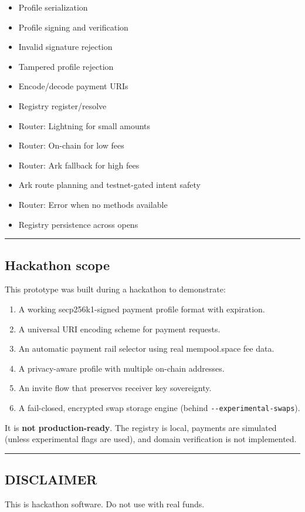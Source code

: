 \documentclass[
]{article}
\providecommand{\tightlist}{%
  \setlength{\itemsep}{0pt}\setlength{\parskip}{0pt}}
\begin{document}
\begin{itemize}
\tightlist
\item
  Profile serialization
\item
  Profile signing and verification
\item
  Invalid signature rejection
\item
  Tampered profile rejection
\item
  Encode/decode payment URIs
\item
  Registry register/resolve
\item
  Router: Lightning for small amounts
\item
  Router: On-chain for low fees
\item
  Router: Ark fallback for high fees
\item
  Ark route planning and testnet-gated intent safety
\item
  Router: Error when no methods available
\item
  Registry persistence across opens
\end{itemize}

\begin{center}\rule{0.5\linewidth}{0.5pt}\end{center}

\hypertarget{hackathon-scope}{%
\subsection{Hackathon scope}\label{hackathon-scope}}

This prototype was built during a hackathon to demonstrate:

\begin{enumerate}
\def\labelenumi{\arabic{enumi}.}
\tightlist
\item
  A working secp256k1-signed payment profile format with expiration.
\item
  A universal URI encoding scheme for payment requests.
\item
  An automatic payment rail selector using real mempool.space fee data.
\item
  A privacy-aware profile with multiple on-chain addresses.
\item
  An invite flow that preserves receiver key sovereignty.
\item
  A fail-closed, encrypted swap storage engine (behind
  \texttt{-\/-experimental-swaps}).
\end{enumerate}

It is \textbf{not production-ready}. The registry is local, payments are
simulated (unless experimental flags are used), and domain verification
is not implemented.

\begin{center}\rule{0.5\linewidth}{0.5pt}\end{center}

\hypertarget{disclaimer}{%
\subsection{DISCLAIMER}\label{disclaimer}}

This is hackathon software. Do not use with real funds.
\end{document}

